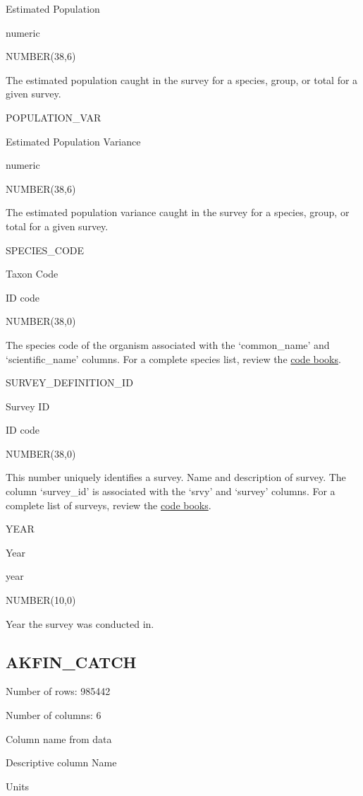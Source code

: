 \documentclass[
  letterpaper,
  oneside,
  open=any]{scrbook}
\begin{document}
Estimated Population

numeric

NUMBER(38,6)

The estimated population caught in the survey for a species, group, or
total for a given survey.

POPULATION\_VAR

Estimated Population Variance

numeric

NUMBER(38,6)

The estimated population variance caught in the survey for a species,
group, or total for a given survey.

SPECIES\_CODE

Taxon Code

ID code

NUMBER(38,0)

The species code of the organism associated with the `common\_name' and
`scientific\_name' columns. For a complete species list, review the
\href{https://www.fisheries.noaa.gov/resource/document/groundfish-survey-species-code-manual-and-data-codes-manual}{code
books}.

SURVEY\_DEFINITION\_ID

Survey ID

ID code

NUMBER(38,0)

This number uniquely identifies a survey. Name and description of
survey. The column `survey\_id' is associated with the `srvy' and
`survey' columns. For a complete list of surveys, review the
\href{https://www.fisheries.noaa.gov/resource/document/groundfish-survey-species-code-manual-and-data-codes-manual}{code
books}.

YEAR

Year

year

NUMBER(10,0)

Year the survey was conducted in.

\hypertarget{akfin_catch}{%
\subsection{AKFIN\_CATCH}\label{akfin_catch}}

Number of rows: 985442

Number of columns: 6

Column name from data

Descriptive column Name

Units
\end{document}
